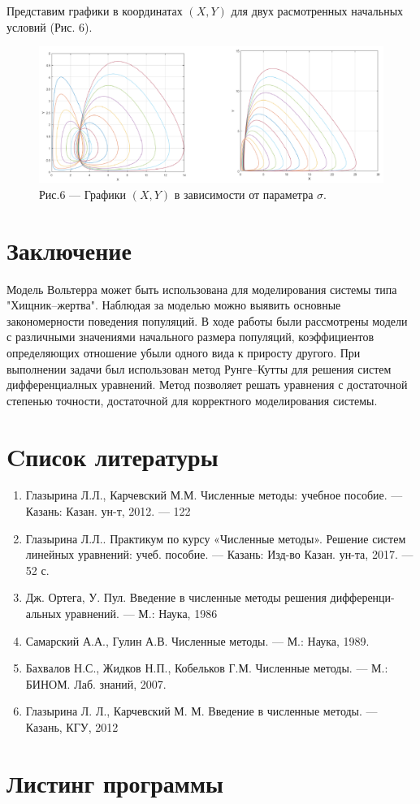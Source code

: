 \documentclass[a4paper,12pt]{article}
\begin{document}
Представим графики в координатах $(X, Y)$ для двух расмотренных начальных условий (Рис. 6).
\begin{figure}[h]
    \centering
    \includegraphics[width=1\linewidth]{pictures/task4.png}
    \captionsetup{labelformat=empty}
    \caption{Рис.6 --- Графики $(X, Y)$ в зависимости от параметра $\sigma$.}
\end{figure}

\newpage
\section{Заключение}
\hspace{0.5cm} Модель Вольтерра может быть использована для моделирования системы типа "Хищник--жертва".
Наблюдая за моделью можно выявить основные закономерности поведения популяций. В ходе работы были рассмотрены
модели с различными значениями начального размера популяций, коэффициентов определяющих отношение убыли 
одного вида к приросту другого. При выполнении задачи был использован метод Рунге--Кутты для решения систем 
дифференциалных уравнений. Метод позволяет решать уравнения с достаточной степенью точности, достаточной для 
корректного моделирования системы.
\newpage
\section{Cписок литературы}
\begin{enumerate}
    \item Глазырина Л.Л., Карчевский М.М. Численные методы: учебное пособие. — Казань: Казан.
    ун-т, 2012. — 122 
    \item Глазырина Л.Л.. Практикум по курсу «Численные методы». Решение
    систем линейных уравнений: учеб. пособие. — Казань: Изд-во Казан. ун-та, 2017. — 52 с.
    \item Дж. Ортега, У. Пул. Введение в численные методы решения дифференци-
    альных уравнений. — М.: Наука, 1986
    \item Самарский А.А., Гулин А.В. Численные методы. — М.: Наука, 1989.
    \item Бахвалов Н.С., Жидков Н.П., Кобельков Г.М. Численные методы. — М.:
    БИНОМ. Лаб. знаний, 2007.
    \item Глазырина Л. Л., Карчевский М. М. Введение в численные методы. —
    Казань, КГУ, 2012
\end{enumerate}
\newpage

\section{Листинг программы}

\end{document}
